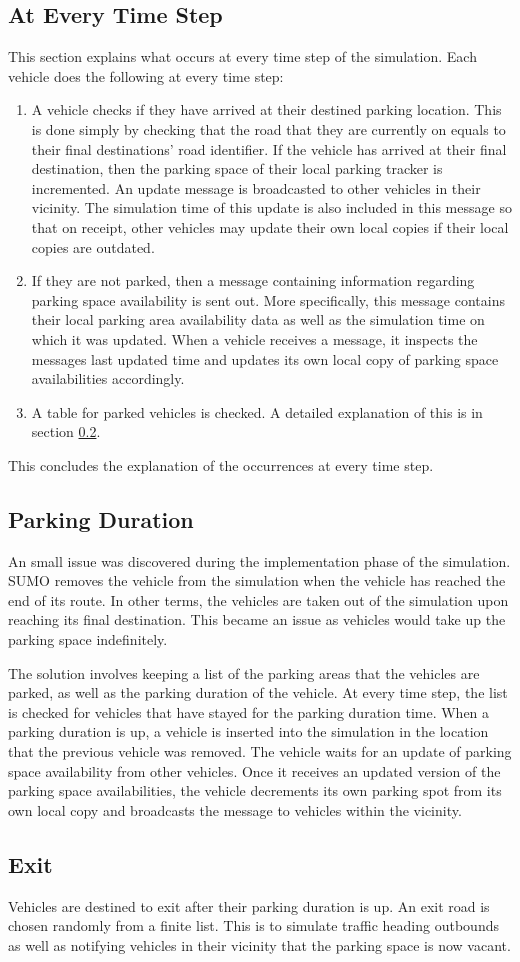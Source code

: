 \subsection{At Every Time Step} \label{ssec:time_step}
This section explains what occurs at every time step of the simulation. Each vehicle does the following at every time step:
\begin{enumerate}
    \item A vehicle checks if they have arrived at their destined parking location. This is done simply by checking that the road that they are currently on equals to their final destinations' road identifier. If the vehicle has arrived at their final destination, then the parking space of their local parking tracker is incremented. An update message is broadcasted to other vehicles in their vicinity. The simulation time of this update is also included in this message so that on receipt, other vehicles may update their own local copies if their local copies are outdated.
    \item If they are not parked, then a message containing information regarding parking space availability is sent out. More specifically, this message contains their local parking area availability data as well as the simulation time on which it was updated. When a vehicle receives a message, it inspects the messages last updated time and updates its own local copy of parking space availabilities accordingly.
    \item A table for parked vehicles is checked. A detailed explanation of this is in section \ref{ssec:parking}.
\end{enumerate}

This concludes the explanation of the occurrences at every time step.

\subsection{Parking Duration} \label{ssec:parking}
An small issue was discovered during the implementation phase of the simulation. SUMO removes the vehicle from the simulation when the vehicle has reached the end of its route. In other terms, the vehicles are taken out of the simulation upon reaching its final destination. This became an issue as vehicles would take up the parking space indefinitely.

The solution involves keeping a list of the parking areas that the vehicles are parked, as well as the parking duration of the vehicle. At every time step, the list is checked for vehicles that have stayed for the parking duration time. When a parking duration is up, a vehicle is inserted into the simulation in the location that the previous vehicle was removed. The vehicle waits for an update of parking space availability from other vehicles. Once it receives an updated version of the parking space availabilities, the vehicle decrements its own parking spot from its own local copy and broadcasts the message to vehicles within the vicinity.

\subsection{Exit}
Vehicles are destined to exit after their parking duration is up. An exit road is chosen randomly from a finite list. This is to simulate traffic heading outbounds as well as notifying vehicles in their vicinity that the parking space is now vacant.
